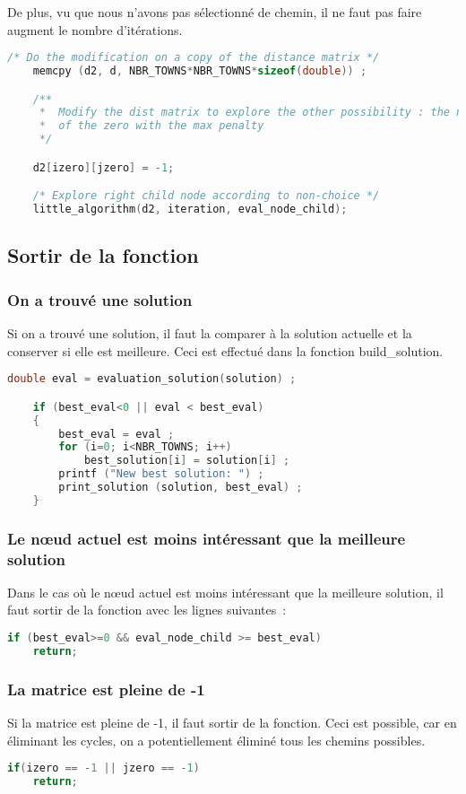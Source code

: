 \documentclass[11pt]{article}
\begin{document}
De plus, vu que nous n'avons pas sélectionné de chemin, il ne faut pas faire augment le nombre d'itérations.

\begin{lstlisting}[language=C]
    /* Do the modification on a copy of the distance matrix */
    memcpy (d2, d, NBR_TOWNS*NBR_TOWNS*sizeof(double)) ;

    /**
     *  Modify the dist matrix to explore the other possibility : the non-choice
     *  of the zero with the max penalty
     */

    d2[izero][jzero] = -1;

    /* Explore right child node according to non-choice */
    little_algorithm(d2, iteration, eval_node_child);
\end{lstlisting}

\subsection{Sortir de la fonction}

\subsubsection{On a trouvé une solution}

Si on a trouvé une solution, il faut la comparer à la solution actuelle et la conserver si elle est meilleure.
Ceci est effectué dans la fonction build\_solution.

\begin{lstlisting}[language=C]
    double eval = evaluation_solution(solution) ;

    if (best_eval<0 || eval < best_eval)
    {
        best_eval = eval ;
        for (i=0; i<NBR_TOWNS; i++)
            best_solution[i] = solution[i] ;
        printf ("New best solution: ") ;
        print_solution (solution, best_eval) ;
    }
\end{lstlisting}

\subsubsection{Le nœud actuel est moins intéressant que la meilleure solution}

Dans le cas où le nœud actuel est moins intéressant que la meilleure solution, il faut sortir de la fonction avec les lignes suivantes :

\begin{lstlisting}[language=C]
if (best_eval>=0 && eval_node_child >= best_eval)
    return;
\end{lstlisting}

\subsubsection{La matrice est pleine de -1}

Si la matrice est pleine de -1, il faut sortir de la fonction. Ceci est possible, car en éliminant les cycles, on a potentiellement éliminé tous les chemins possibles.
\begin{lstlisting}[language=C]
if(izero == -1 || jzero == -1)
    return;
\end{lstlisting}
\end{document}
